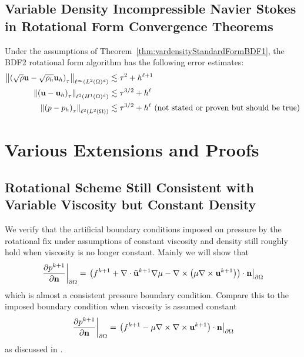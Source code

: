 \documentclass[letterpaper]{erdc}
\begin{document}
\section{Variable Density Incompressible Navier Stokes in Rotational Form Convergence Theorems}

\begin{conjecture}
  Under the assumptions of Theorem~\ref{thm:vardensityStandardFormBDF1}, the BDF2 rotational form algorithm has the following error estimates:
  \begin{align}
    \left\| \left(\sqrt{\rho} \textbf{u} - \sqrt{\rho_h} \textbf{u}_h \right)_{\tau} \right\|_{\ell^{\infty}(L^2(\Omega)^d)} &\lesssim \tau^2 + h^{\ell+1}\\
    \left\| \left( \textbf{u} - \textbf{u}_h \right)_{\tau} \right\|_{\ell^2(H^1(\Omega)^d)} &\lesssim \tau^{3/2} + h^{\ell}\\
    \left\|\left(p - p_h\right)_{\tau} \right\|_{\ell^{2}(L^2(\Omega))} &\lesssim \tau^{3/2} + h^{\ell}  \mbox{  (not stated or proven but should be true)}
  \end{align}
\end{conjecture}

\appendix
%
%
%
%
\chapter{Various Extensions and Proofs}

%
%
%
\section{Rotational Scheme Still Consistent with Variable Viscosity but Constant Density}
We verify that the artificial boundary conditions imposed on pressure by the rotational fix under assumptions of constant viscosity and density still roughly hold when viscosity is no longer constant.  Mainly we will show that 
\begin{equation}
  \left.\frac{\partial p^{k+1}}{\partial \textbf{n}}\right|_{\partial\Omega} = \left.\left(f^{k+1} + \nabla\cdot\mathbf{\tilde{u}}^{k+1}\nabla\mu - \nabla\times\left(\mu\nabla\times \textbf{u}^{k+1}  \right)  \right)\cdot \textbf{n}\right|_{\partial\Omega}
\end{equation}
which is almost a consistent pressure boundary condition.  Compare this to the imposed boundary condition when viscosity is assumed constant
\begin{equation}
  \left.\frac{\partial p^{k+1}}{\partial \textbf{n}}\right|_{\partial\Omega} = \left.\left(f^{k+1} - \mu\nabla\times\nabla\times \textbf{u}^{k+1} \right)\cdot \textbf{n}\right|_{\partial\Omega}
\end{equation}
 as discussed in \cite{guermond2004error}.  
 
\end{document}
